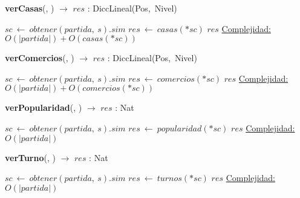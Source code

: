 \begin{Algoritmos}
    \begin{algorithm}[H]{\textbf{verCasas}(, ) $\to$ $res$ : DiccLineal(Pos,\ Nivel)}
    \begin{algorithmic}[1]
        \State $sc\ \leftarrow\ obtener(partida,\ s).sim$
        \State $res\ \leftarrow\ casas(*sc)$
        \State \Return $res$
        \medskip
        \Statex \underline{Complejidad:} $O(|partida|) + O(casas(*sc))$
    \end{algorithmic}
    \end{algorithm}

    \begin{algorithm}[H]{\textbf{verComercios}(, ) $\to$ $res$ : DiccLineal(Pos,\ Nivel)}
    \begin{algorithmic}[1]
        \State $sc\ \leftarrow\ obtener(partida,\ s).sim$
        \State $res\ \leftarrow\ comercios(*sc)$
        \State \Return $res$
        \medskip
        \Statex \underline{Complejidad:} $O(|partida|) + O(comercios(*sc))$
    \end{algorithmic}
    \end{algorithm}

    \begin{algorithm}[H]{\textbf{verPopularidad}(, ) $\to$ $res$ : Nat}
    \begin{algorithmic}[1]
        \State $sc\ \leftarrow\ obtener(partida,\ s).sim$
        \State $res\ \leftarrow\ popularidad(*sc)$
        \State \Return $res$
        \medskip
        \Statex \underline{Complejidad:} $O(|partida|)$
    \end{algorithmic}
    \end{algorithm}

    \begin{algorithm}[H]{\textbf{verTurno}(, ) $\to$ $res$ : Nat}
    \begin{algorithmic}[1]
        \State $sc\ \leftarrow\ obtener(partida,\ s).sim$
        \State $res\ \leftarrow\ turnos(*sc)$
        \State \Return $res$
        \medskip
        \Statex \underline{Complejidad:} $O(|partida|)$
    \end{algorithmic}
    \end{algorithm}

\end{Algoritmos}

